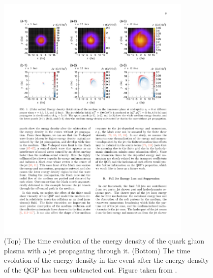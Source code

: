\begin{figure}[htbp]
\begin{center}
\includegraphics[width=0.85\textwidth]{figures/jetMeasurements/JF_snapshot}
\caption{(Top) The time evolution of the energy density of the quark gluon plasma with a jet propagating through it. (Bottom) The time evolution of the energy density in the event after the energy density of the QGP has been subtracted out. Figure taken from \cite{Tachibana:2017syd}.}
\label{fig:jf_snapshot}
\end{center}
\end{figure}

